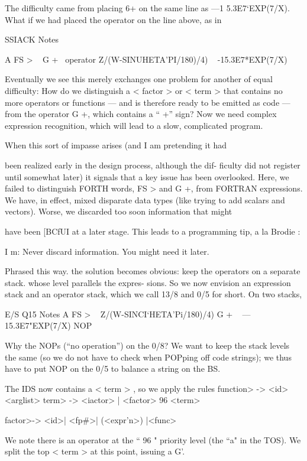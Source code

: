 The difficulty came from placing 6+ on the same line as
—1 5.3E7‘EXP(7/X). What if we had placed the operator on the
line above, as in

 

SSIACK Notes

A FS > \ < subject >
G + \ operator
Z/(W-SINUHETA'PI/180)/4) \ < term >
-15.3E7*EXP(7/X) \ < term >

Eventually we see this merely exchanges one problem for another
of equal difficulty: How do we distinguish a < factor > or
< term > that contains no more operators or functions — and is
therefore ready to be emitted as code — from the operator G +,
which contains a “ +” sign? Now we need complex expression
recognition, which will lead to a slow, complicated program.

When this sort of impasse arises (and I am pretending it had

been realized early in the design process, although the dif-
ﬁculty did not register until somewhat later) it signals that a key
issue has been overlooked. Here, we failed to distinguish FORTH
words, FS > and G +, from FORTRAN expressions. We have, in
effect, mixed disparate data types (like trying to add scalars and
vectors). Worse, we discarded too soon information that might

have been [BCfUI at a later stage. This leads to a programming tip,
a la Brodie :

I m: Never discard information. You might need it later.

Phrased this way. the solution becomes obvious: keep the
operators on a separate stack. whose level parallels the expres-
sions. So we now envision an expression stack and an operator
stack, which we call 13/8 and 0/5 for short. On two stacks,

 

E/S Q15 Notes
A FS > \ < subject >
Z/(W-SINCI‘HETA'Pi/180)/4) G + \ < term >
—15.3E7"EXP(7/X) NOP \ < term >

Why the NOPs (“no operation”) on the 0/8? We want to keep
the stack levels the same (so we do not have to check when
POPping off code strings); we thus have to put NOP on the 0/5
to balance a string on the BS.

The IDS now contains a < term > , so we apply the rules
\<function> -> <id> <arglist>
\<term> -> <iactor> | <factor> 96 <term>

\<factor>-> <id>| <fp#>| (<expr’n>) |<func>

We note there is an operator at the “ 96 " priority level (the “a"
in the TOS). We split the top < term > at this point, issuing a G'.

